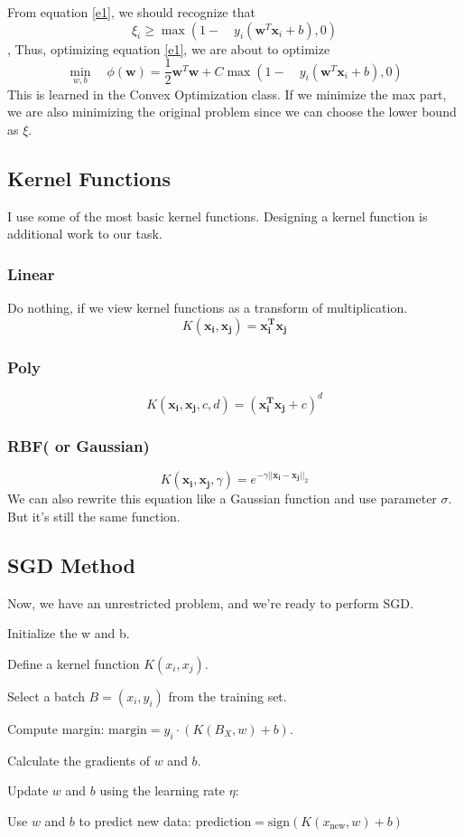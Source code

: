\documentclass[conference]{IEEEtran}
\begin{document}
	From equation \ref{e1}, we should recognize that 
	$$\xi_i \geq \max{(1-\quad y_i(\mathbf{w}^T \mathbf{x}_i + b), 0)}$$, 
	Thus, optimizing equation \ref{e1}, we are about to optimize
	\begin{equation}
		\min_{w,b} \quad \phi(\mathbf{w}) = \frac{1}{2} \mathbf{w}^T \mathbf{w} + C \max{(1-\quad y_i(\mathbf{w}^T \mathbf{x}_i + b), 0)}
		\label{e2}
	\end{equation}
	This is learned in the Convex Optimization class. If we minimize the max part, we are also minimizing the original problem since we can choose the lower bound as $\xi$. 
	
	\subsection*{Kernel Functions}
	I use some of the most basic kernel functions. Designing a kernel function is additional work to our task. 
	\subsubsection{Linear}
	Do nothing, if we view kernel functions as a transform of multiplication.
	\begin{equation}
		K(\mathbf{x_i}, \mathbf{x_j}) = \mathbf{x_i^T x_j}
	\end{equation}
	\subsubsection{Poly}
	\begin{equation}
		K(\mathbf{x_i}, \mathbf{x_j}, c, d) = (\mathbf{x_i^T x_j}+c)^d
	\end{equation}
	\subsubsection{RBF( or Gaussian)}
	\begin{equation}
		K(\mathbf{x_i}, \mathbf{x_j}, \gamma) = e^{-\gamma||\mathbf{x_i}-\mathbf{x_j}||_2}
	\end{equation}
	We can also rewrite this equation like a Gaussian function and use parameter $\sigma$. But it's still the same function.
	\subsection{SGD Method}
	Now, we have an unrestricted problem, and we're ready to perform SGD.
	\begin{algorithm}
		\caption{SGD SVM}
		Initialize the w and b.
		
		Define a kernel function $K(x_i, x_j)$.
		
		{
			Select a batch $B = {(x_i, y_i)}$ from the training set.
			
			Compute margin: $\text{margin} = y_i \cdot (K(B_X, w) + b)$.
			
			Calculate the gradients of $w$ and $b$.
			
			Update $w$ and $b$ using the learning rate $\eta$:
		}
		
		Use $w$ and $b$ to predict new data:
		$\text{prediction} = \text{sign}(K(x_{\text{new}}, w) + b)$
	\end{algorithm}
	
\end{document}
